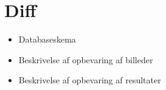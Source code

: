 {
\section*{Diff}
\begin{itemize}
    \item Databaseskema
    \item Beskrivelse af opbevaring af billeder
    \item Beskrivelse af opbevaring af resultater
\end{itemize}

}

